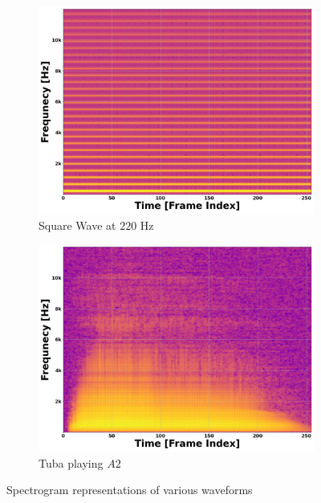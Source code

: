 \documentclass[12pt,letterpaper]{article}
\begin{document}
\begin{figure}[H]
	\begin{subfigure}[b]{0.45\textwidth}
	\centering
	\includegraphics[scale=0.2]{../FiguresSpectrogram/SquareWave-220}
	\caption{Square Wave at $220$ Hz}
	\end{subfigure}
	\hfill
	\begin{subfigure}[b]{0.45\textwidth}
	\centering
	\includegraphics[scale=0.2]{../FiguresSpectrogram/Tuba-A2}
	\caption{Tuba playing $A2$}
	\end{subfigure}

\caption{Spectrogram representations of various waveforms}
\label{fig-Spectrograms}
\end{figure}

\end{document}
